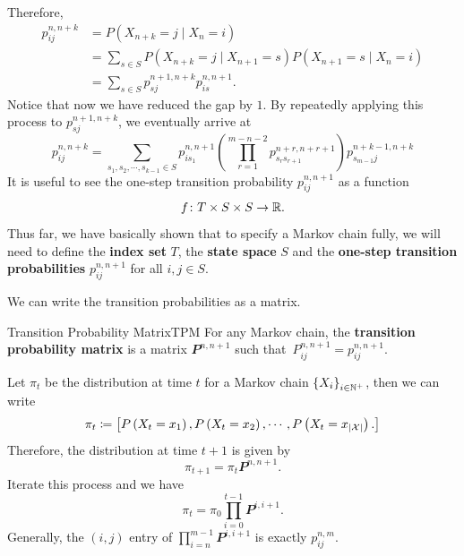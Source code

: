 \documentclass[math, code]{amznotes}
\theoremstyle{remark}
\begin{document}
Therefore, 
\begin{align*}
    p_{ij}^{n, n + k} & = P\left(X_{n + k} = j \mid X_n = i\right) \\
    & = \sum_{s \in S}P\left(X_{n + k} = j \mid X_{n + 1} = s\right)P\left(X_{n + 1} = s \mid X_n = i\right) \\
    & = \sum_{s \in S}p_{sj}^{n + 1, n + k}p_{is}^{n, n + 1}.
\end{align*}
Notice that now we have reduced the gap by $1$. By repeatedly applying this process to $p_{sj}^{n + 1, n + k}$, we eventually arrive at 
\begin{equation*}
    p_{ij}^{n, n + k} = \sum_{s_1, s_2, \cdots, s_{k - 1} \in S}p_{is_1}^{n, n + 1}\left(\prod_{r = 1}^{m - n - 2}p_{s_rs_{r + 1}}^{n + r, n + r + 1}\right)p_{s_{m - 1}j}^{n + k - 1, n + k}
\end{equation*}
It is useful to see the one-step transition probability $p_{ij}^{n, n + 1}$ as a function 
\begin{equation*}
    f \colon T \times S \times S \to \mathbb{R}.
\end{equation*}
Thus far, we have basically shown that to specify a Markov chain fully, we will need to define the \textbf{index set} $T$, the \textbf{state space} $S$ and the \textbf{one-step transition probabilities} $p_{ij}^{n, n + 1}$ for all $i, j \in S$. 

We can write the transition probabilities as a matrix.
\begin{dfnbox}{Transition Probability Matrix}{TPM}
    For any Markov chain, the {\color{red} \textbf{transition probability matrix}} is a matrix $\mathbfit{P}^{n, n + 1}$ such that~$P^{n, n + 1}_{ij} = p_{ij}^{n, n + 1}$.
\end{dfnbox}
Let $\pi_t$ be the distribution at time $t$ for a Markov chain $\left\{X_i\right\}_{i \in \mathbb{N}^+}$, then we can write 
\begin{equation*}
    \pi_t \coloneqq \begin{bmatrix}
        P\left(X_t = x_1\right), P\left(X_t = x_2\right), \cdots, P\left(X_t = x_{{\left\lvert {\mathcal{X}} \right\rvert}}\right).
    \end{bmatrix}
\end{equation*}
Therefore, the distribution at time $t + 1$ is given by 
\begin{equation*}
    \pi_{t + 1} = \pi_t\mathbfit{P}^{n, n + 1}.
\end{equation*}
Iterate this process and we have 
\begin{equation*}
    \pi_t = \pi_0\prod_{i = 0}^{t - 1}\mathbfit{P}^{i, i + 1}.
\end{equation*}
Generally, the $\left(i, j\right)$ entry of $\prod_{i = n}^{m - 1}\mathbfit{P}^{i, i + 1}$ is exactly $p_{ij}^{n, m}$.
\end{document}
